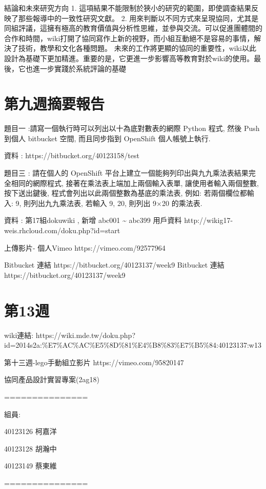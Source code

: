 \documentclass[]{article}
\begin{document}
結論和未來研究方向 1.
這項結果不能限制於狹小的研究的範圍，即使調查結果反映了那些報導中的一致性研究文獻。
2.
用來判斷以不同方式來呈現協同，尤其是同組評議，這擁有極高的教育價值與分析性思維，並參與交流。可以促進團體間的合作和時間，wiki打開了協同寫作上新的視野，而小組互動絕不是容易的事情，解決了技術，教學和文化各種問題。
未來的工作將更顯的協同的重要性，wiki以此設計為基礎下更加精進。重要的是，它更進一步影響高等教育對於wiki的使用。最後，它也進一步實踐於系統評論的基礎

\section{第九週摘要報告}\label{ux7b2cux4e5dux9031ux6458ux8981ux5831ux544a}

題目一 :請寫一個執行時可以列出以十為底對數表的網際 Python 程式, 然後
Push 到個人 bitbucket 空間, 而且同步指到 OpenShift 個人帳號上執行.

資料 : https://bitbucket.org/40123158/test

題目三 : 請在個人的 OpenShift
平台上建立一個能夠列印出與九九乘法表結果完全相同的網際程式,
接著在乘法表上端加上兩個輸入表單, 讓使用者輸入兩個整數, 按下送出鍵後,
程式會列出以此兩個整數為基底的乘法表, 例如: 若兩個欄位都輸入: 9,
則列出九九乘法表, 若輸入 9, 20, 則列出 9×20 的乘法表.

資料 : 第17組dokuwiki , 新增 abc001 \textasciitilde{} abc399 用戶資料
http://wikig17-weis.rhcloud.com/doku.php?id=start

上傳影片- 個人Vimeo https://vimeo.com/92577964

Bitbucket 連結 https://bitbucket.org/40123137/week9 Bitbucket 連結
https://bitbucket.org/40123137/week9

\section{第13週}\label{ux7b2c13ux9031}

wiki連結:
https://wiki.mde.tw/doku.php?id=2014s2a:\%E7\%AC\%AC\%E5\%8D\%81\%E4\%B8\%83\%E7\%B5\%84:40123137:w13

第十三週-lego手動組立影片 https://vimeo.com/95820147

協同產品設計實習專案(2ag18)

===============

組員:

40123126 柯嘉洋

40123128 胡瀚中

40123149 蔡東維

===============
\end{document}
